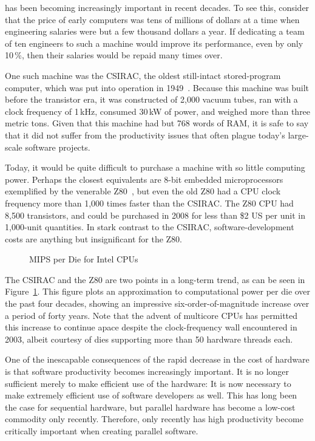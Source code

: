 has been becoming increasingly important in recent decades.
To see this, consider that the price of early computers was tens
of millions of dollars at
a time when engineering salaries were but a few thousand dollars a year.
If dedicating a team of ten engineers to such a machine would improve
its performance, even by only 10\,\%, then their salaries
would be repaid many times over.

One such machine was the CSIRAC, the oldest still-intact stored-program
computer, which was put into operation in
1949~\cite{CSIRACMuseumVictoria,CSIRACUniversityMelbourne}.
Because this machine was built before the transistor era, it was constructed
of 2,000 vacuum tubes, ran with a clock frequency of 1\,kHz,
consumed 30\,kW of power, and weighed more than three metric tons.
Given that this machine had but 768 words of RAM, it is safe to say that
it did not suffer from the productivity issues that often plague
today's large-scale software projects.

Today, it would be quite difficult to purchase a machine with so
little computing power.
Perhaps the closest equivalents
are 8-bit embedded microprocessors exemplified by the venerable
Z80~\cite{z80Wikipedia}, but even the old Z80 had a CPU clock
frequency more than 1,000 times faster than the CSIRAC\@.
The Z80 CPU had 8,500 transistors, and could be purchased in 2008
for less than \$2 US per unit in 1,000-unit quantities.
In stark contrast to the CSIRAC, software-development costs are
anything but insignificant for the Z80.

\begin{figure}
\centering
{}
\caption{MIPS per Die for Intel CPUs}
\label{fig:intro:MIPS per Die for Intel CPUs}
\end{figure}

The CSIRAC and the Z80 are two points in a long-term trend, as can be
seen in
Figure~\ref{fig:intro:MIPS per Die for Intel CPUs}.
This figure plots an approximation to computational power per die
over the past four decades, showing an impressive six-order-of-magnitude
increase over a period of forty years.
Note that the advent of multicore CPUs has permitted this increase to
continue apace despite the clock-frequency wall encountered in 2003,
albeit courtesy of dies supporting more than 50 hardware threads each.

One of the inescapable consequences of the rapid decrease in
the cost of hardware is that software productivity becomes increasingly
important.
It is no longer sufficient merely to make efficient use of the hardware:
It is now necessary to make extremely efficient use of software
developers as well.
This has long been the case for sequential hardware, but
parallel hardware has become a low-cost commodity only recently.
Therefore, only recently has high productivity become critically important
when creating parallel software.

